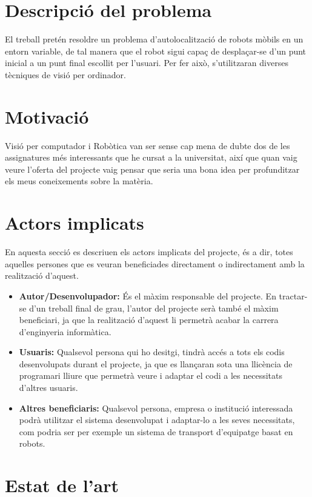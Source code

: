 \section{Descripció del problema}
	El treball pretén resoldre un problema d'autolocalització de robots mòbils en un entorn variable, de tal manera que el robot sigui capaç de desplaçar-se d'un punt inicial a un punt final escollit per
	l'usuari. Per fer això, s'utilitzaran diverses tècniques de visió per ordinador.
\section{Motivació}
	Visió per computador i Robòtica van ser sense cap mena de dubte dos de les assignatures més interessants que he cursat a la universitat, així que quan vaig veure l'oferta del projecte vaig pensar que
	seria una bona idea per profunditzar els meus coneixements sobre la matèria.
\section{Actors implicats}
	En aquesta secció es descriuen els actors implicats del projecte, és a dir, totes aquelles persones que es veuran beneficiades directament o indirectament amb la realització d'aquest.\\
	\begin{itemize}
		\item \textbf{Autor/Desenvolupador:} És el màxim responsable del projecte. En tractar-se d'un treball final de grau, l'autor del projecte serà també el màxim beneficiari, ja que la realització d'aquest li permetrà acabar la carrera d'enginyeria informàtica.
		\item \textbf{Usuaris:} Qualsevol persona qui ho desitgi, tindrà accés a tots els codis desenvolupats durant el projecte, ja que es llançaran sota una llicència de programari lliure que permetrà veure i adaptar el codi a les necessitats d'altres usuaris.
		\item \textbf{Altres beneficiaris:} Qualsevol persona, empresa o institució interessada podrà utilitzar el sistema desenvolupat i adaptar-lo a les seves necessitats, com podria ser per exemple un sistema de transport d'equipatge basat en robots.
	\end{itemize}
\newpage
\section{Estat de l'art}
